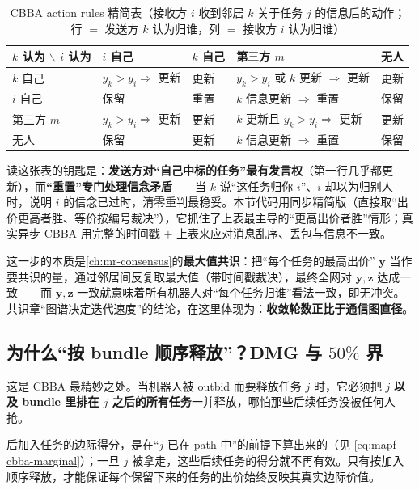 \begin{table}[H]\centering\small
\caption{CBBA action rules 精简表（接收方 $i$ 收到邻居 $k$ 关于任务 $j$ 的信息后的动作；行 $=$ 发送方 $k$ 认为归谁，列 $=$ 接收方 $i$ 认为归谁）}
\label{tab:mapf-cbba-rules}
\begin{tabular}{lllll}
\toprule
$k$ 认为 $\backslash$ $i$ 认为 & $i$ 自己 & $k$ 自己 & 第三方 $m$ & 无人 \\
\midrule
$k$ 自己 & $y_k>y_i\Rightarrow$ 更新 & 更新 & $y_k>y_i$ 或 $k$ 更新 $\Rightarrow$ 更新 & 更新 \\
$i$ 自己 & 保留 & 重置 & $k$ 信息更新 $\Rightarrow$ 重置 & 保留 \\
第三方 $m$ & $y_k>y_i\Rightarrow$ 更新 & 更新 & $k$ 更新且 $y_k>y_i\Rightarrow$ 更新 & 更新 \\
无人 & 保留 & 更新 & $k$ 信息更新 $\Rightarrow$ 重置 & 保留 \\
\bottomrule
\end{tabular}
\end{table}

读这张表的钥匙是：\textbf{发送方对“自己中标的任务”最有发言权}（第一行几乎都更新），而\textbf{“重置”专门处理信念矛盾}——当 $k$ 说“这任务归你 $i$”、$i$ 却以为归别人时，说明 $i$ 的信念已过时，清零重判最稳妥。本节代码用同步精简版（直接取“出价更高者胜、等价按编号裁决”），它抓住了上表最主导的“更高出价者胜”情形；真实异步 CBBA 用完整的时间戳 $+$ 上表来应对消息乱序、丢包与信息不一致。

\begin{insight}
这一步的本质是\cref{ch:mr-consensus}的\textbf{最大值共识}：把“每个任务的最高出价” $\mathbf{y}$ 当作要共识的量，通过邻居间反复取最大值（带时间戳裁决），最终全网对 $\mathbf{y},\mathbf{z}$ 达成一致——而 $\mathbf{y},\mathbf{z}$ 一致就意味着所有机器人对“每个任务归谁”看法一致，即无冲突。共识章“图谱决定迭代速度”的结论，在这里体现为：\textbf{收敛轮数正比于通信图直径}。
\end{insight}

\subsection{为什么“按 bundle 顺序释放”？DMG 与 \texorpdfstring{$50\%$}{50} 界}
\label{sec:mapf-cbba-bound}

这是 CBBA 最精妙之处。当机器人被 outbid 而要释放任务 $j$ 时，它必须把 $j$ \textbf{以及 bundle 里排在 $j$ 之后的所有任务}一并释放，哪怕那些后续任务没被任何人抢。

\begin{insight}[释放纪律的理由]
后加入任务的边际得分，是在“$j$ 已在 path 中”的前提下算出来的（见 \cref{eq:mapf-cbba-marginal}）；一旦 $j$ 被拿走，这些后续任务的得分就不再有效。只有按加入顺序释放，才能保证每个保留下来的任务的出价始终反映其真实边际价值。
\end{insight}


